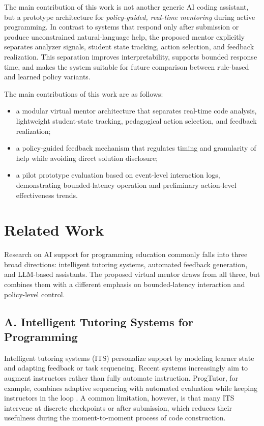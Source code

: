 \documentclass[conference]{IEEEtran}
\begin{document}
The main contribution of this work is not another generic AI coding assistant, but a prototype architecture for \emph{policy-guided, real-time mentoring} during active programming. In contrast to systems that respond only after submission or produce unconstrained natural-language help, the proposed mentor explicitly separates analyzer signals, student state tracking, action selection, and feedback realization. This separation improves interpretability, supports bounded response time, and makes the system suitable for future comparison between rule-based and learned policy variants.

The main contributions of this work are as follows:
\begin{itemize}
\item a modular virtual mentor architecture that separates real-time code analysis, lightweight student-state tracking, pedagogical action selection, and feedback realization;
\item a policy-guided feedback mechanism that regulates timing and granularity of help while avoiding direct solution disclosure;
\item a pilot prototype evaluation based on event-level interaction logs, demonstrating bounded-latency operation and preliminary action-level effectiveness trends.
\end{itemize}

\section{Related Work}

Research on AI support for programming education commonly falls into three broad directions: intelligent tutoring systems, automated feedback generation, and LLM-based assistants. The proposed virtual mentor draws from all three, but combines them with a different emphasis on bounded-latency interaction and policy-level control.

\subsection*{A. Intelligent Tutoring Systems for Programming}

Intelligent tutoring systems (ITS) personalize support by modeling learner state and adapting feedback or task sequencing. Recent systems increasingly aim to augment instructors rather than fully automate instruction. ProgTutor, for example, combines adaptive sequencing with automated evaluation while keeping instructors in the loop \cite{ProgTutor}. A common limitation, however, is that many ITS intervene at discrete checkpoints or after submission, which reduces their usefulness during the moment-to-moment process of code construction.
\end{document}

